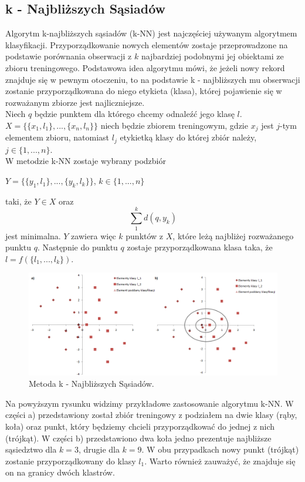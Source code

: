 \documentclass[12pt,a4paper]{report}
\begin{document}
\subsection{k - Najbliższych Sąsiadów}%
Algorytm k-najbliższych sąsiadów (k-NN) jest najczęściej używanym algorytmem klasyfikacji. 
Przyporządkowanie nowych elementów zostaje przeprowadzone na podstawie porównania obserwacji z $k$ najbardziej podobnymi jej obiektami ze zbioru treningowego. Podstawowa idea algorytmu mówi, że jeżeli nowy rekord znajduje się w pewnym otoczeniu, to na podstawie k - najbliższych mu obserwacji zostanie przyporządkowana do niego etykieta (klasa), której pojawienie się w rozważanym zbiorze jest najliczniejsze.
\\Niech $q$ będzie punktem dla którego chcemy odnaleźć jego klasę $l$. 
\\$X=\{\{x_1,l_1\},...,\{x_n,l_n\}\}$ niech będzie zbiorem treningowym, gdzie $x_j$ jest $j$-tym elementem zbioru, natomiast $l_j$ etykietką klasy do której zbiór należy, $j\in\{1,...,n\}$.
\\W metodzie k-NN zostaje wybrany podzbiór 
\begin{center}
$Y=\{\{y_1,l_1\},...,\{y_k,l_k\}\}$, $k\in\{1,...,n\}$
\end{center}
taki, że $Y \in X$ oraz $$\sum_1^k d(q,y_k)$$ jest minimalna. $Y$ zawiera więc $k$ punktów z $X$, które leżą najbliżej rozważanego punktu $q$. Następnie do punktu $q$ zostaje przyporządkowana klasa taka, że $l=f(\{l_1,...,l_k\})$.
\begin{center}
\begin{figure}[H]
\centering
\includegraphics[scale=0.5]{kNN.PNG} 
\caption{Metoda k - Najbliższych Sąsiadów.}
\end{figure}
\end{center}
Na powyższym rysunku widzimy przykładowe zastosowanie algorytmu k-NN. W części a) przedstawiony został zbiór treningowy z podziałem na dwie klasy (rąby, koła) oraz punkt, który będziemy chcieli przyporządkować do jednej z nich (trójkąt). W części b) przedstawiono dwa koła jedno prezentuje najbliższe sąsiedztwo dla $k = 3$, drugie dla $k = 9$. W obu przypadkach nowy punkt (trójkąt) zostanie przyporządkowany do klasy $l_1$. Warto również zauważyć, że znajduje się on na granicy dwóch klastrów.
\end{document}
